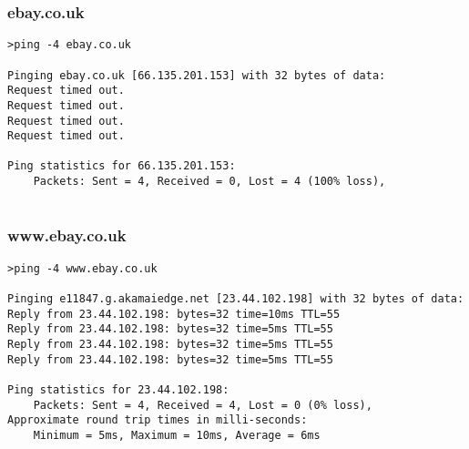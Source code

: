 \subsubsection{ebay.co.uk}
\begin{lstlisting}[breaklines, frame=single, basicstyle=\footnotesize, tabsize=2, numberstyle=\footnotesize]
>ping -4 ebay.co.uk

Pinging ebay.co.uk [66.135.201.153] with 32 bytes of data:
Request timed out.
Request timed out.
Request timed out.
Request timed out.

Ping statistics for 66.135.201.153:
    Packets: Sent = 4, Received = 0, Lost = 4 (100% loss),
    
\end{lstlisting}

\subsubsection{www.ebay.co.uk}
\begin{lstlisting}[breaklines, frame=single, basicstyle=\footnotesize, tabsize=2, numberstyle=\footnotesize]
>ping -4 www.ebay.co.uk
    
Pinging e11847.g.akamaiedge.net [23.44.102.198] with 32 bytes of data:
Reply from 23.44.102.198: bytes=32 time=10ms TTL=55
Reply from 23.44.102.198: bytes=32 time=5ms TTL=55
Reply from 23.44.102.198: bytes=32 time=5ms TTL=55
Reply from 23.44.102.198: bytes=32 time=5ms TTL=55
  
Ping statistics for 23.44.102.198:
    Packets: Sent = 4, Received = 4, Lost = 0 (0% loss),
Approximate round trip times in milli-seconds:
    Minimum = 5ms, Maximum = 10ms, Average = 6ms
    
\end{lstlisting}